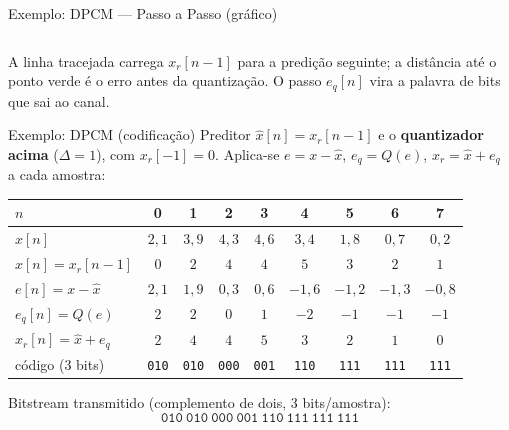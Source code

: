 \begin{frame}{Exemplo: DPCM — Passo a Passo (gráfico)}
\begin{columns}[c]
\begin{center}
    \end{center}
  \end{columns}

  \vspace{0.05cm}
  {\footnotesize A linha tracejada carrega $x_r[n-1]$ para a predição seguinte;
  a distância até o ponto \textcolor{UNB_GREEN}{verde} é o erro antes da
  quantização. O passo $e_q[n]$ vira a palavra de bits que sai ao canal.}
\end{frame}


\begin{frame}{Exemplo: DPCM (codificação)}
  Preditor $\hat{x}[n] = x_r[n-1]$ e o \textbf{quantizador acima}
  ($\Delta = 1$), com $x_r[-1]=0$. Aplica-se $e=x-\hat{x}$, $e_q=Q(e)$,
  $x_r=\hat{x}+e_q$ a cada amostra:

  \vspace{0.1cm}
  \begin{center}
  \scriptsize
  \renewcommand{\arraystretch}{1.15}
  \begin{tabular}{l|cccccccc}
    $n$ & 0 & 1 & 2 & 3 & 4 & 5 & 6 & 7 \\
    \hline
    $x[n]$                & $2{,}1$ & $3{,}9$ & $4{,}3$ & $4{,}6$ & $3{,}4$ & $1{,}8$ & $0{,}7$ & $0{,}2$ \\
    $\hat{x}[n]=x_r[n-1]$ & $0$ & $2$ & $4$ & $4$ & $5$ & $3$ & $2$ & $1$ \\
    $e[n]=x-\hat{x}$      & $2{,}1$ & $1{,}9$ & $0{,}3$ & $0{,}6$ & $-1{,}6$ & $-1{,}2$ & $-1{,}3$ & $-0{,}8$ \\
    $e_q[n]=Q(e)$         & $2$ & $2$ & $0$ & $1$ & $-2$ & $-1$ & $-1$ & $-1$ \\
    $x_r[n]=\hat{x}+e_q$  & $2$ & $4$ & $4$ & $5$ & $3$ & $2$ & $1$ & $0$ \\
    código (3 bits)       & \texttt{010} & \texttt{010} & \texttt{000} & \texttt{001} & \texttt{110} & \texttt{111} & \texttt{111} & \texttt{111} \\
  \end{tabular}
  \end{center}

  \vspace{0.1cm}
  Bitstream transmitido (complemento de dois, 3 bits/amostra):
  \[
    \boxed{\;\texttt{010}\ \texttt{010}\ \texttt{000}\ \texttt{001}\ \texttt{110}\ \texttt{111}\ \texttt{111}\ \texttt{111}\;}
  \]
\end{frame}

